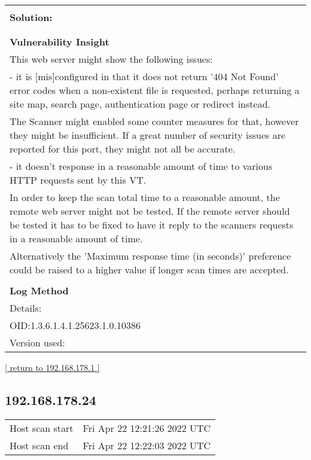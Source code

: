 \documentclass{article}
\begin{document}
\begin{longtable}{|p{}|}
          \hline
          \\
\textbf{Solution:}\\
\\

          \hline
          \\
\textbf{Vulnerability Insight}\\
This web server might show the following issues:\\
  - it is [mis]configured in that it does not return '404 Not Found' error codes when a non-existent
  file is requested, perhaps returning a site map, search page, authentication page or redirect instead.\\
  The Scanner might enabled some counter measures for that, however they might be insufficient. If a
  great number of security issues are reported for this port, they might not all be accurate.\\
  - it doesn't response in a reasonable amount of time to various HTTP requests sent by this VT.\\
  In order to keep the scan total time to a reasonable amount, the remote web server might not be
  tested. If the remote server should be tested it has to be fixed to have it reply to the scanners
  requests in a reasonable amount of time.\\
  Alternatively the 'Maximum response time (in seconds)' preference could be raised to a higher
  value if longer scan times are accepted.\\


        \hline
        \\
\textbf{Log Method}\\
Details:
\rowcolor{white}{\verb=Response Time / No 404 Error Code Check=}\\
OID:1.3.6.1.4.1.25623.1.0.10386\\
Version used:
\rowcolor{white}{\verb=2020-11-27T13:32:50Z=}\\
\end{longtable}

\begin{footnotesize}\hyperref[host:192.168.178.1]{[ return to 192.168.178.1 ]}\end{footnotesize}
\subsection{192.168.178.24}
\label{host:192.168.178.24}

\begin{tabular}{ll}
Host scan start&Fri Apr 22 12:21:26 2022 UTC\\
Host scan end&Fri Apr 22 12:22:03 2022 UTC\\
\end{tabular}
\end{document}
